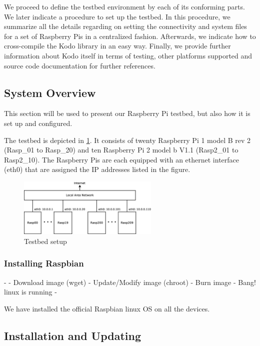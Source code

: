 \label{sec:testbed}

We proceed to define the testbed environment by each of its conforming
parts. We later indicate a procedure to set up the testbed. In this procedure,
we summarize all the details regarding on setting the connectivity and
system files for a set of Raspberry Pis in a centralized fashion.
Afterwards, we indicate how to cross-compile the Kodo library in an
easy way. Finally, we provide further information about Kodo itself in terms
of testing, other platforms supported and source code documentation
for further references.

\subsection{System Overview}

This section will be used to present our Raspberry Pi testbed, but also how
it is set up and configured.

The testbed is depicted in \ref{fig:testbed_setup}. It consists of twenty
Raspberry Pi 1 model B rev 2 (Rasp\_01 to Rasp\_20) and 
ten Raspberry Pi 2 model b V1.1 (Rasp2\_01 to Rasp2\_10).
The Raspberry Pis are each equipped with an ethernet interface (eth0) that are
assigned the \ac{IP} addresses listed in the figure.

\begin{figure}[ht!]
\centering
\includegraphics[width=0.6\textwidth]{images/testbed_setup.eps}
\caption{Testbed setup}
\label{fig:testbed_setup}
\end{figure}

\subsubsection{Installing Raspbian}

- 
- Download image (wget)
- Update/Modify image (chroot)
- Burn image
- Bang! linux is running
- 


We have installed the official Raspbian linux \ac{OS} on all the devices.



\subsection{Installation and Updating}
